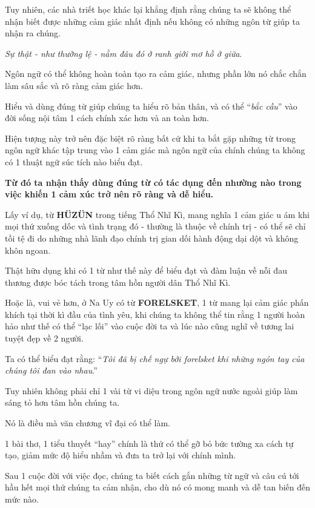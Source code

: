 \documentclass{article}
\begin{document}
Tuy nhiên, các nhà triết học khác lại khẳng định rằng chúng ta sẽ không thể nhận biết được những cảm giác nhất định nếu không có những ngôn từ giúp ta nhận ra chúng.

%
\textit{Sự thật - như thường lệ - nằm đâu đó ở ranh giới mơ hồ ở giữa}.

Ngôn ngữ có thể không hoàn toàn tạo ra cảm giác, nhưng phần lớn nó chắc chắn làm sâu sắc và rõ ràng cảm giác hơn.

Hiểu và dùng đúng từ giúp chúng ta hiểu rõ bản thân, và có thể ``\textit{bắc cầu}'' vào đời sống nội tâm 1 cách chính xác hơn và an toàn hơn.

%
Hiện tượng này trở nên đặc biệt rõ ràng bất cứ khi ta bắt gặp những từ trong ngôn ngữ khác tập trung vào 1 cảm giác mà ngôn ngữ của chính chúng ta không có 1 thuật ngữ súc tích nào biểu đạt.

\textbf{Từ đó ta nhận thấy dùng đúng từ có tác dụng đến nhường nào trong việc khiến 1 cảm xúc trở nên rõ ràng và dễ hiểu.}

%
Lấy ví dụ, từ \textbf{HÜZÜN} trong tiếng Thổ Nhĩ Kì, mang nghĩa 1 cảm giác u ám khi mọi thứ xuống dốc và tình trạng đó - thường là thuộc về chính trị - có thể sẽ chỉ tồi tệ đi do những nhà lãnh đạo chính trị gian dối hành động dại dột và không khôn ngoan.

Thật hữu dụng khi có 1 từ như thế này để biểu đạt và đàm luận về nỗi đau thương được bóc tách trong tâm hồn người dân Thổ Nhĩ Kì.

%
Hoặc là, vui vẻ hơn, ở Na Uy có từ \textbf{FORELSKET}, 1 từ mang lại cảm giác phấn khích tại thời kì đầu của tình yêu, khi chúng ta không thể tin rằng 1 người hoàn hảo như thế có thể ``lạc lối'' vào cuộc đời ta và lúc nào cũng nghĩ về tương lai tuyệt đẹp về 2 người.

Ta có thể biểu đạt rằng: ``\textit{Tôi đã bị chế ngự bởi forelsket khi những ngón tay của chúng tôi đan vào nhau}.''

%
Tuy nhiên không phải chỉ 1 vài từ vi diệu trong ngôn ngữ nước ngoài giúp làm sáng tỏ hơn tâm hồn chúng ta.

Nó là điều mà văn chương vĩ đại có thể làm.

1 bài thơ, 1 tiểu thuyết ``hay'' chính là thứ có thể gỡ bỏ bức tường xa cách tự tạo, giảm mức độ hiểu nhầm và đưa ta trở lại với chính mình.

Sau 1 cuộc đời với việc đọc, chúng ta biết cách gắn những từ ngữ và câu cú tới hầu hết mọi thứ chúng ta cảm nhận, cho dù nó có mong manh và dễ tan biến đến mức nào.
\end{document}
